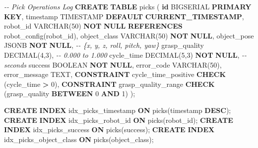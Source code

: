 \documentclass[
]{article}
\newenvironment{Shaded}{\begin{snugshade}}{\end{snugshade}}
\newcommand{\CommentTok}[1]{\textcolor[rgb]{0.56,0.35,0.01}{\textit{#1}}}
\newcommand{\DataTypeTok}[1]{\textcolor[rgb]{0.13,0.29,0.53}{#1}}
\newcommand{\DecValTok}[1]{\textcolor[rgb]{0.00,0.00,0.81}{#1}}
\newcommand{\FunctionTok}[1]{\textcolor[rgb]{0.13,0.29,0.53}{\textbf{#1}}}
\newcommand{\KeywordTok}[1]{\textcolor[rgb]{0.13,0.29,0.53}{\textbf{#1}}}
\newcommand{\NormalTok}[1]{#1}
\newcommand{\OperatorTok}[1]{\textcolor[rgb]{0.81,0.36,0.00}{\textbf{#1}}}
\begin{document}
\begin{Shaded}
\begin{Highlighting}[]
\CommentTok{{-}{-} Pick Operations Log}
\KeywordTok{CREATE} \KeywordTok{TABLE}\NormalTok{ picks (}
    \KeywordTok{id}\NormalTok{ BIGSERIAL }\KeywordTok{PRIMARY} \KeywordTok{KEY}\NormalTok{,}
    \DataTypeTok{timestamp} \DataTypeTok{TIMESTAMP} \KeywordTok{DEFAULT} \FunctionTok{CURRENT\_TIMESTAMP}\NormalTok{,}
\NormalTok{    robot\_id }\DataTypeTok{VARCHAR}\NormalTok{(}\DecValTok{50}\NormalTok{) }\KeywordTok{NOT} \KeywordTok{NULL} \KeywordTok{REFERENCES}\NormalTok{ robot\_config(robot\_id),}
\NormalTok{    object\_class }\DataTypeTok{VARCHAR}\NormalTok{(}\DecValTok{50}\NormalTok{) }\KeywordTok{NOT} \KeywordTok{NULL}\NormalTok{,}
\NormalTok{    object\_pose JSONB }\KeywordTok{NOT} \KeywordTok{NULL}\NormalTok{,  }\CommentTok{{-}{-} \{x, y, z, roll, pitch, yaw\}}
\NormalTok{    grasp\_quality }\DataTypeTok{DECIMAL}\NormalTok{(}\DecValTok{4}\NormalTok{,}\DecValTok{3}\NormalTok{),  }\CommentTok{{-}{-} 0.000 to 1.000}
\NormalTok{    cycle\_time }\DataTypeTok{DECIMAL}\NormalTok{(}\DecValTok{5}\NormalTok{,}\DecValTok{3}\NormalTok{) }\KeywordTok{NOT} \KeywordTok{NULL}\NormalTok{,  }\CommentTok{{-}{-} seconds}
\NormalTok{    success }\DataTypeTok{BOOLEAN} \KeywordTok{NOT} \KeywordTok{NULL}\NormalTok{,}
\NormalTok{    error\_code }\DataTypeTok{VARCHAR}\NormalTok{(}\DecValTok{50}\NormalTok{),}
\NormalTok{    error\_message TEXT,}
    \KeywordTok{CONSTRAINT}\NormalTok{ cycle\_time\_positive }\KeywordTok{CHECK}\NormalTok{ (cycle\_time }\OperatorTok{\textgreater{}} \DecValTok{0}\NormalTok{),}
    \KeywordTok{CONSTRAINT}\NormalTok{ grasp\_quality\_range }\KeywordTok{CHECK}\NormalTok{ (grasp\_quality }\KeywordTok{BETWEEN} \DecValTok{0} \KeywordTok{AND} \DecValTok{1}\NormalTok{)}
\NormalTok{);}

\KeywordTok{CREATE} \KeywordTok{INDEX}\NormalTok{ idx\_picks\_timestamp }\KeywordTok{ON}\NormalTok{ picks(}\DataTypeTok{timestamp} \KeywordTok{DESC}\NormalTok{);}
\KeywordTok{CREATE} \KeywordTok{INDEX}\NormalTok{ idx\_picks\_robot\_id }\KeywordTok{ON}\NormalTok{ picks(robot\_id);}
\KeywordTok{CREATE} \KeywordTok{INDEX}\NormalTok{ idx\_picks\_success }\KeywordTok{ON}\NormalTok{ picks(success);}
\KeywordTok{CREATE} \KeywordTok{INDEX}\NormalTok{ idx\_picks\_object\_class }\KeywordTok{ON}\NormalTok{ picks(object\_class);}


\end{Highlighting}
\end{Shaded}
\end{document}
